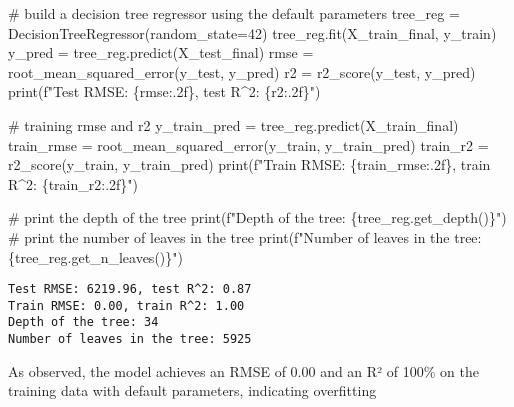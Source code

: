 \documentclass[
  letterpaper,
  DIV=11,
  numbers=noendperiod]{scrreprt}
\newenvironment{Shaded}{\begin{snugshade}}{\end{snugshade}}
\newcommand{\BuiltInTok}[1]{\textcolor[rgb]{0.00,0.23,0.31}{#1}}
\newcommand{\CommentTok}[1]{\textcolor[rgb]{0.37,0.37,0.37}{#1}}
\newcommand{\DecValTok}[1]{\textcolor[rgb]{0.68,0.00,0.00}{#1}}
\newcommand{\NormalTok}[1]{\textcolor[rgb]{0.00,0.23,0.31}{#1}}
\newcommand{\OperatorTok}[1]{\textcolor[rgb]{0.37,0.37,0.37}{#1}}
\newcommand{\SpecialCharTok}[1]{\textcolor[rgb]{0.37,0.37,0.37}{#1}}
\newcommand{\SpecialStringTok}[1]{\textcolor[rgb]{0.13,0.47,0.30}{#1}}
\begin{document}
\begin{Shaded}
\begin{Highlighting}[]
\CommentTok{\# build a decision tree regressor using the default parameters}
\NormalTok{tree\_reg }\OperatorTok{=}\NormalTok{ DecisionTreeRegressor(random\_state}\OperatorTok{=}\DecValTok{42}\NormalTok{)}
\NormalTok{tree\_reg.fit(X\_train\_final, y\_train)}
\NormalTok{y\_pred }\OperatorTok{=}\NormalTok{ tree\_reg.predict(X\_test\_final)}
\NormalTok{rmse }\OperatorTok{=}\NormalTok{ root\_mean\_squared\_error(y\_test, y\_pred)}
\NormalTok{r2 }\OperatorTok{=}\NormalTok{ r2\_score(y\_test, y\_pred)}
\BuiltInTok{print}\NormalTok{(}\SpecialStringTok{f"Test RMSE: }\SpecialCharTok{\{}\NormalTok{rmse}\SpecialCharTok{:.2f\}}\SpecialStringTok{, test R\^{}2: }\SpecialCharTok{\{}\NormalTok{r2}\SpecialCharTok{:.2f\}}\SpecialStringTok{"}\NormalTok{)}

\CommentTok{\# training rmse and r2}
\NormalTok{y\_train\_pred }\OperatorTok{=}\NormalTok{ tree\_reg.predict(X\_train\_final)}
\NormalTok{train\_rmse }\OperatorTok{=}\NormalTok{ root\_mean\_squared\_error(y\_train, y\_train\_pred)}
\NormalTok{train\_r2 }\OperatorTok{=}\NormalTok{ r2\_score(y\_train, y\_train\_pred)}
\BuiltInTok{print}\NormalTok{(}\SpecialStringTok{f"Train RMSE: }\SpecialCharTok{\{}\NormalTok{train\_rmse}\SpecialCharTok{:.2f\}}\SpecialStringTok{, train R\^{}2: }\SpecialCharTok{\{}\NormalTok{train\_r2}\SpecialCharTok{:.2f\}}\SpecialStringTok{"}\NormalTok{)}

\CommentTok{\# print the depth of the tree}
\BuiltInTok{print}\NormalTok{(}\SpecialStringTok{f"Depth of the tree: }\SpecialCharTok{\{}\NormalTok{tree\_reg}\SpecialCharTok{.}\NormalTok{get\_depth()}\SpecialCharTok{\}}\SpecialStringTok{"}\NormalTok{)}
\CommentTok{\# print the number of leaves in the tree}
\BuiltInTok{print}\NormalTok{(}\SpecialStringTok{f"Number of leaves in the tree: }\SpecialCharTok{\{}\NormalTok{tree\_reg}\SpecialCharTok{.}\NormalTok{get\_n\_leaves()}\SpecialCharTok{\}}\SpecialStringTok{"}\NormalTok{)}
\end{Highlighting}
\end{Shaded}

\begin{verbatim}
Test RMSE: 6219.96, test R^2: 0.87
Train RMSE: 0.00, train R^2: 1.00
Depth of the tree: 34
Number of leaves in the tree: 5925
\end{verbatim}

As observed, the model achieves an RMSE of 0.00 and an R² of 100\% on
the training data with default parameters, indicating overfitting
\end{document}
